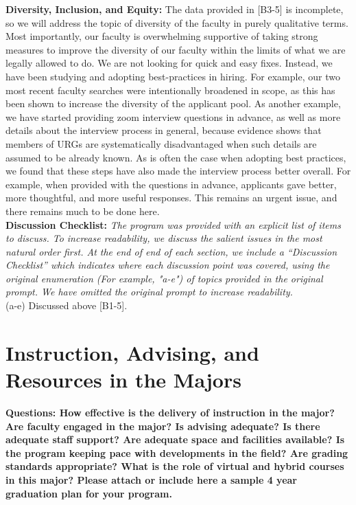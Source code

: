 \documentclass[12pt]{article}
\begin{document}
\noindent
{\bf Diversity, Inclusion, and Equity:} The data provided in [B3-5] is
incomplete, so we will address the topic of diversity of the faculty
in purely qualitative terms.  Most importantly, our faculty is
overwhelming supportive of taking strong measures to improve the
diversity of our faculty within the limits of what we are legally
allowed to do.  We are not looking for quick and easy fixes.  Instead,
we have been studying and adopting best-practices in hiring.  For
example, our two most recent faculty searches were intentionally
broadened in scope, as this has been shown to increase the diversity
of the applicant pool.  As another example, we have started providing
zoom interview questions in advance, as well as more details about the
interview process in general, because evidence shows that members of
URGs are systematically disadvantaged when such details are assumed to
be already known.  As is often the case when adopting best practices,
we found that these steps have also made the interview process better
overall. For example, when provided with the questions in advance,
applicants gave better, more thoughtful, and more useful responses.
This remains an urgent issue, and there remains much to be done
here.\\[3pt]

\noindent
{\bf Discussion Checklist:} 
{\it The program was provided with an
  explicit list of items to discuss.  To increase readability, we
  discuss the salient issues in the most natural order first.  At the
  end of end of each section, we include a ``Discussion Checklist'' which
  indicates where each discussion point was covered, using the
  original enumeration (For example, "a-e") of topics provided in the original
  prompt. We have omitted the original prompt to increase
  readability.}\\[3pt]
  (a-e) Discussed above [B1-5].\\[3pt]

\newpage
\section{Instruction, Advising, and Resources in the Majors}
\label{sec:instruction}

{\bf Questions: How effective is the delivery of instruction in the
  major? Are faculty engaged in the major? Is advising adequate? Is
  there adequate staff support? Are adequate space and facilities
  available? Is the program keeping pace with developments in the
  field? Are grading standards appropriate? What is the role of
  virtual and hybrid courses in this major? Please attach or include
  here a sample 4 year graduation plan for your program.}\\[3pt]
\end{document}
